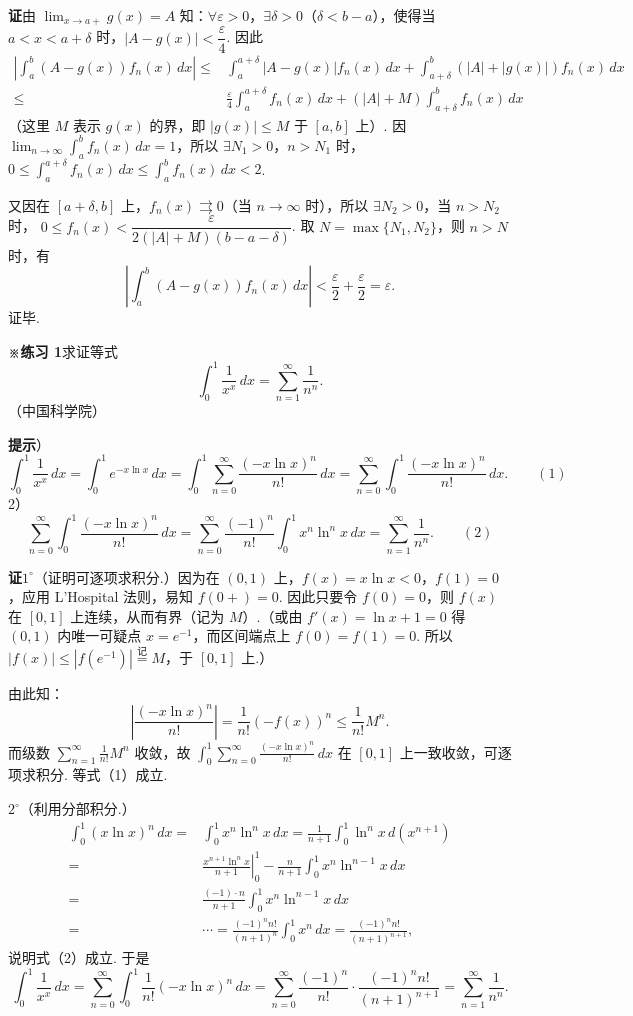\documentclass[UTF8, 12pt, fontset=fandol, oneside]{ctexart}
\begin{document}
\noindent\textbf{证}\quad 由 $\displaystyle\lim_{x\to a+}g(x)=A$ 知：$\forall\varepsilon>0$，$\exists\delta>0$（$\delta<b-a$），使得当
$a<x<a+\delta$ 时，$|A-g(x)|<\dfrac\varepsilon4$. 因此
\[
\begin{aligned}
\left|\int_a^b(A-g(x))f_n(x)\,dx\right|
\le{}&\int_a^{a+\delta}|A-g(x)|f_n(x)\,dx
+\int_{a+\delta}^b(|A|+|g(x)|)f_n(x)\,dx\\
\le{}&\frac\varepsilon4\int_a^{a+\delta}f_n(x)\,dx
+(|A|+M)\int_{a+\delta}^b f_n(x)\,dx
\end{aligned}
\]
（这里 $M$ 表示 $g(x)$ 的界，即 $|g(x)|\le M$ 于 $[a,b]$ 上）. 因
$\displaystyle\lim_{n\to\infty}\int_a^b f_n(x)\,dx=1$，所以
$\exists N_1>0$，$n>N_1$ 时，
$0\le\displaystyle\int_a^{a+\delta}f_n(x)\,dx\le\int_a^b f_n(x)\,dx<2$.

又因在 $[a+\delta,b]$ 上，$f_n(x)\rightrightarrows0$（当 $n\to\infty$ 时），所以
$\exists N_2>0$，当 $n>N_2$ 时，
$0\le f_n(x)<\dfrac{\varepsilon}{2(|A|+M)(b-a-\delta)}$. 取
$N=\max\{N_1,N_2\}$，则 $n>N$ 时，有
\[
  \left|\int_a^b(A-g(x))f_n(x)\,dx\right|
  <\frac\varepsilon2+\frac\varepsilon2=\varepsilon.
\]
证毕.

\noindent\textbf{※练习 1}\quad 求证等式
\[
  \int_0^1\frac1{x^x}\,dx=\sum_{n=1}^{\infty}\frac1{n^n}.
\]
（中国科学院）

\noindent\textbf{提示}）
\[
  \int_0^1\frac1{x^x}\,dx
  =\int_0^1 e^{-x\ln x}\,dx
  =\int_0^1\sum_{n=0}^{\infty}\frac{(-x\ln x)^n}{n!}\,dx
  =\sum_{n=0}^{\infty}\int_0^1\frac{(-x\ln x)^n}{n!}\,dx.
\qquad(1)
\]
2）
\[
  \sum_{n=0}^{\infty}\int_0^1\frac{(-x\ln x)^n}{n!}\,dx
  =\sum_{n=0}^{\infty}\frac{(-1)^n}{n!}\int_0^1x^n\ln^n x\,dx
  =\sum_{n=1}^{\infty}\frac1{n^n}.
\qquad(2)
\]

\noindent\textbf{证}\quad $1^\circ$（证明可逐项求积分.）因为在 $(0,1)$ 上，$f(x)=x\ln x<0$，$f(1)=0$，应用 L'Hospital 法则，易知
$f(0+)=0$. 因此只要令 $f(0)=0$，则 $f(x)$ 在 $[0,1]$ 上连续，从而有界（记为 $M$）.（或由
$f'(x)=\ln x+1=0$ 得 $(0,1)$ 内唯一可疑点 $x=e^{-1}$，而区间端点上 $f(0)=f(1)=0$. 所以
$|f(x)|\le |f(e^{-1})|\overset{\text{记}}=M$，于 $[0,1]$ 上.）

由此知：
\[
  \left|\frac{(-x\ln x)^n}{n!}\right|
  =\frac1{n!}(-f(x))^n\le\frac1{n!}M^n.
\]
而级数 $\displaystyle\sum_{n=1}^{\infty}\frac1{n!}M^n$ 收敛，故
$\displaystyle\int_0^1\sum_{n=0}^{\infty}\frac{(-x\ln x)^n}{n!}\,dx$
在 $[0,1]$ 上一致收敛，可逐项求积分. 等式（1）成立.

$2^\circ$（利用分部积分.）
\[
\begin{aligned}
\int_0^1(x\ln x)^n\,dx
={}&\int_0^1x^n\ln^n x\,dx
=\frac1{n+1}\int_0^1\ln^n x\,d(x^{n+1})\\
={}&\left.\frac{x^{n+1}\ln^n x}{n+1}\right|_0^1
-\frac n{n+1}\int_0^1x^n\ln^{n-1}x\,dx\\
={}&\frac{(-1)\cdot n}{n+1}\int_0^1x^n\ln^{n-1}x\,dx\\
={}&\cdots=\frac{(-1)^n n!}{(n+1)^n}\int_0^1x^n\,dx
=\frac{(-1)^n n!}{(n+1)^{n+1}},
\end{aligned}
\]
说明式（2）成立. 于是
\[
  \int_0^1\frac1{x^x}\,dx
  =\sum_{n=0}^{\infty}\int_0^1\frac1{n!}(-x\ln x)^n\,dx
  =\sum_{n=0}^{\infty}\frac{(-1)^n}{n!}\cdot\frac{(-1)^n n!}{(n+1)^{n+1}}
  =\sum_{n=1}^{\infty}\frac1{n^n}.
\]
\end{document}
